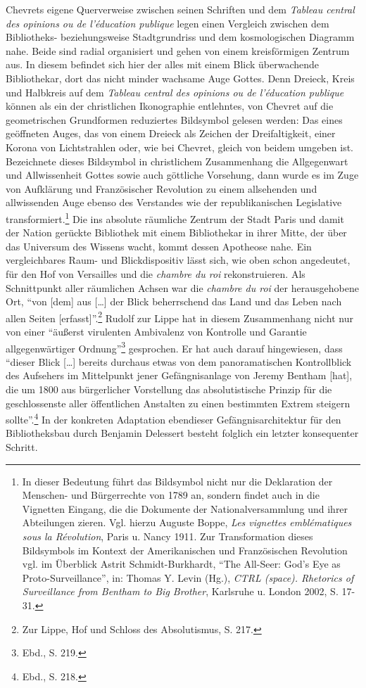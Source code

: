 Chevrets eigene Querverweise zwischen seinen Schriften und dem
\emph{Tableau central des opinions ou de l'éducation publique} legen
einen Vergleich zwischen dem Bibliotheks- beziehungsweise Stadtgrundriss
und dem kosmologischen Diagramm nahe. Beide sind radial organisiert und
gehen von einem kreisförmigen Zentrum aus. In diesem befindet sich hier
der alles mit einem Blick überwachende Bibliothekar, dort das nicht
minder wachsame Auge Gottes. Denn Dreieck, Kreis und Halbkreis auf dem
\emph{Tableau central des opinions ou de l'éducation publique} können
als ein der christlichen Ikonographie entlehntes, von Chevret auf die
geometrischen Grundformen reduziertes Bildsymbol gelesen werden: Das
eines geöffneten Auges, das von einem Dreieck als Zeichen der
Dreifaltigkeit, einer Korona von Lichtstrahlen oder, wie bei Chevret,
gleich von beidem umgeben ist. Bezeichnete dieses Bildsymbol in
christlichem Zusammenhang die Allgegenwart und Allwissenheit Gottes
sowie auch göttliche Vorsehung, dann wurde es im Zuge von Aufklärung und
Französischer Revolution zu einem allsehenden und allwissenden Auge
ebenso des Verstandes wie der republikanischen Legislative
transformiert.\footnote{In dieser Bedeutung führt das Bildsymbol nicht
  nur die Deklaration der Menschen- und Bürgerrechte von 1789 an,
  sondern findet auch in die Vignetten Eingang, die die Dokumente der
  Nationalversammlung und ihrer Abteilungen zieren. Vgl. hierzu Auguste
  Boppe, \emph{Les vignettes emblématiques sous la Révolution}, Paris u.
  Nancy 1911. Zur Transformation dieses Bildsymbols im Kontext der
  Amerikanischen und Französischen Revolution vgl. im Überblick Astrit
  Schmidt-Burkhardt, \enquote{The All-Seer: God's Eye as
  Proto-Surveillance}, in: Thomas Y. Levin (Hg.), \emph{CTRL (space).
  Rhetorics of Surveillance from Bentham to Big Brother}, Karlsruhe u.
  London 2002, S. 17-31.} Die ins absolute räumliche Zentrum der Stadt
Paris und damit der Nation gerückte Bibliothek mit einem Bibliothekar in
ihrer Mitte, der über das Universum des Wissens wacht, kommt dessen
Apotheose nahe. Ein vergleichbares Raum- und Blickdispositiv lässt sich,
wie oben schon angedeutet, für den Hof von Versailles und die
\emph{chambre du roi} rekonstruieren. Als Schnittpunkt aller räumlichen
Achsen war die \emph{chambre du roi} der herausgehobene Ort,
\enquote{von {[}dem{]} aus {[}\ldots{}{]} der Blick beherrschend das
Land und das Leben nach allen Seiten {[}erfasst{]}}.\footnote{Zur Lippe,
  Hof und Schloss des Absolutismus, S. 217.} Rudolf zur Lippe hat in
diesem Zusammenhang nicht nur von einer \enquote{äußerst virulenten
Ambivalenz von Kontrolle und Garantie allgegenwärtiger
Ordnung}\footnote{Ebd., S. 219.} gesprochen. Er hat auch darauf
hingewiesen, dass \enquote{dieser Blick {[}\ldots{}{]} bereits durchaus
etwas von dem panoramatischen Kontrollblick des Aufsehers im Mittelpunkt
jener Gefängnisanlage von Jeremy Bentham {[}hat{]}, die um 1800 aus
bürgerlicher Vorstellung das absolutistische Prinzip für die
geschlossenste aller öffentlichen Anstalten zu einen bestimmten Extrem
steigern sollte}.\footnote{Ebd., S. 218.} In der konkreten Adaptation
ebendieser Gefängnisarchitektur für den Bibliotheksbau durch Benjamin
Delessert besteht folglich ein letzter konsequenter Schritt.

